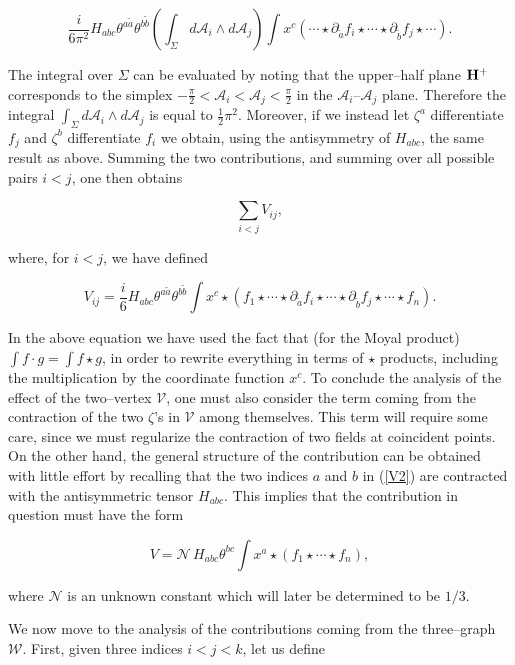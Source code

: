 \documentclass[a4paper,11pt]{article}
\newcommand{\mathbb}[1]{{\bf{#1}}}
\begin{document}
$$
\frac{i}{6\pi ^{2}}H_{abc}\theta ^{a\widetilde{a}}\theta ^{b\widetilde{b}}
\left( \int_{\Sigma }d\mathcal{A}_{i}\wedge d\mathcal{A}_{j}\right) \int
x^{c}\left( \cdots \star \partial _{\widetilde{a}}f_{i}\star \cdots \star
\partial _{\widetilde{b}}f_{j}\star \cdots \right) .
$$

\noindent
The integral over $\Sigma $ can be evaluated by noting that the upper--half
plane $\mathbb{H}^{+}$ corresponds to the simplex $-\frac{\pi}{2} < 
\mathcal{A}_{i} < \mathcal{A}_{j} < \frac{\pi}{2}$ in the 
$\mathcal{A}_{i}$--$\mathcal{A}_{j}$ plane. Therefore the integral 
$\int_{\Sigma} d\mathcal{A}_{i} \wedge d\mathcal{A}_{j}$ is equal to 
$\frac{1}{2}\pi^{2}$. Moreover, if we instead let $\zeta^{a}$ differentiate 
$f_{j}$ and $\zeta^{b}$ differentiate $f_{i}$ we obtain, using the 
antisymmetry of $H_{abc}$, the same result as above. Summing the two 
contributions, and summing over all possible pairs $i<j$, one then 
obtains

$$
\sum_{i<j}V_{ij} ,
$$

\noindent
where, for $i<j$, we have defined 

$$
V_{ij}=\frac{i}{6}H_{abc} \theta^{a\widetilde{a}} \theta^{b\widetilde{b}}
\int x^{c}\star \left( f_{1}\star \cdots \star \partial_{\widetilde{a}}
f_{i}\star \cdots \star \partial_{\widetilde{b}} f_{j}\star \cdots \star
f_{n}\right) .
$$

\noindent
In the above equation we have used the fact that (for the Moyal product) 
$\int f \cdot g=\int f\star g$, in order to rewrite everything in terms 
of $\star$ products, including the multiplication by the coordinate function 
$x^{c}$. To conclude the analysis of the effect of the two--vertex 
$\mathcal{V}$, one must also consider the term coming from the contraction of 
the two $\zeta$'s in $\mathcal{V}$ among themselves. This term will require 
some care, since we must regularize the contraction of two fields at 
coincident points. On the other hand, the general structure of the contribution 
can be obtained with little effort by recalling that the two indices $a$ and 
$b$ in (\ref{V2}) are contracted with the antisymmetric tensor $H_{abc}$. 
This implies that the contribution in question must have the form 

$$
V=\mathcal{N\,}H_{abc}\theta ^{bc}\int x^{a}\star \left( f_{1}\star \cdots
\star f_{n}\right) ,
$$

\noindent
where $\mathcal{N}$ is an unknown constant which will later be determined 
to be $1/3$.

We now move to the analysis of the contributions coming from the
three--graph $\mathcal{W}$. First, given three indices $i<j<k$, let us
define 
\end{document}
